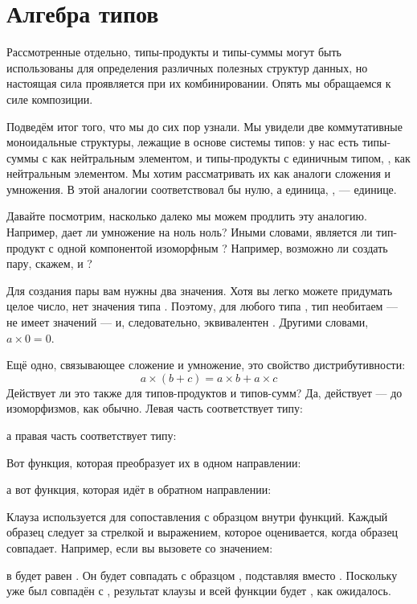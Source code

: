 \section{Алгебра типов}

Рассмотренные отдельно, типы-продукты и типы-суммы могут быть использованы для определения различных полезных структур данных, но настоящая сила проявляется при их комбинировании. Опять мы обращаемся к силе композиции.

Подведём итог того, что мы до сих пор узнали. Мы увидели две коммутативные моноидальные структуры, лежащие в основе системы типов: у нас есть типы-суммы с  как нейтральным элементом, и типы-продукты с единичным типом, \code{()}, как нейтральным элементом. Мы хотим рассматривать их как аналоги сложения и умножения. В этой аналогии  соответствовал бы нулю, а единица, \code{()}, — единице.

Давайте посмотрим, насколько далеко мы можем продлить эту аналогию. Например, дает ли умножение на ноль ноль? Иными словами, является ли тип-продукт с одной компонентой  изоморфным ? Например, возможно ли создать пару, скажем,  и ?

Для создания пары вам нужны два значения. Хотя вы легко можете придумать целое число, нет значения типа . Поэтому, для любого типа , тип  необитаем — не имеет значений — и, следовательно, эквивалентен . Другими словами, $a \times 0 = 0$.

Ещё одно, связывающее сложение и умножение, это свойство дистрибутивности:
$$a \times (b + c) = a \times b + a \times c$$
Действует ли это также для типов-продуктов и типов-сумм? Да, действует — до изоморфизмов, как обычно. Левая часть соответствует типу:

а правая часть соответствует типу:

Вот функция, которая преобразует их в одном направлении:

а вот функция, которая идёт в обратном направлении:

Клауза  используется для сопоставления с образцом внутри функций. Каждый образец следует за стрелкой и выражением, которое оценивается, когда образец совпадает. Например, если вы вызовете  со значением:

 в  будет равен . Он будет совпадать с образцом , подставляя  вместо . Поскольку  уже был совпадён с , результат клаузы  и всей функции будет , как ожидалось.

